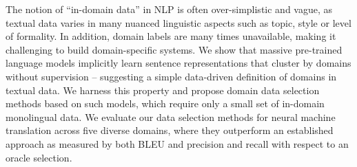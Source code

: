 The notion of ``in-domain data'' in NLP is often over-simplistic and vague, as textual data varies in many nuanced linguistic aspects such as topic, style or level of formality. In addition, domain labels are many times unavailable, making it challenging to build domain-specific systems.  We show that massive pre-trained language models implicitly learn sentence representations that cluster by domains without supervision -- suggesting a simple data-driven definition of domains in textual data. We harness this property and propose domain data selection methods based on such models, which require only a small set of in-domain monolingual data. We evaluate our data selection methods for neural machine translation across five diverse domains, where they outperform an established approach as measured by both BLEU and precision and recall with respect to an oracle selection.
